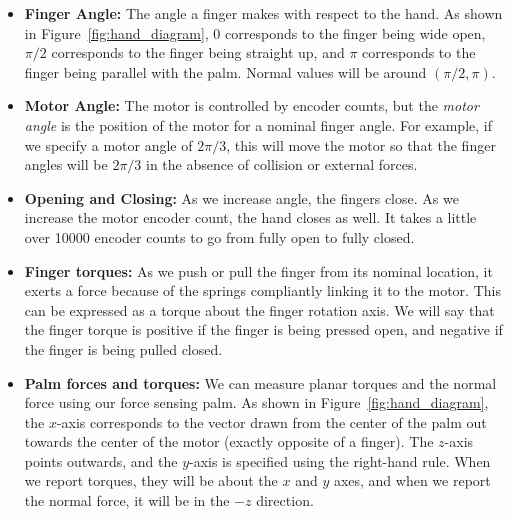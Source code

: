 \documentclass[letterpaper,notitlepage,10pt]{article}
\begin{document}
\begin{itemize}
\item \textbf{Finger Angle:} The angle a finger makes with respect to the hand. As shown in Figure~\ref{fig:hand_diagram}, 0 corresponds to the finger being wide open, $\pi/2$ corresponds to the finger being straight up, and $\pi$ corresponds to the finger being parallel with the palm. Normal values will be around $(\pi/2, \pi)$.
\item \textbf{Motor Angle:} The motor is controlled by encoder counts, but the \emph{motor angle} is the position of the motor for a nominal finger angle. For example, if we specify a motor angle of $2\pi/3$, this will move the motor so that the finger angles will be $2\pi/3$ in the absence of collision or external forces.
\item \textbf{Opening and Closing:} As we increase angle, the fingers close. As we increase the motor encoder count, the hand closes as well. It takes a little over 10000 encoder counts to go from fully open to fully closed.
\item \textbf{Finger torques:} As we push or pull the finger from its nominal location, it exerts a force because of the springs compliantly linking it to the motor. This can be expressed as a torque about the finger rotation axis. We will say that the finger torque is positive if the finger is being pressed open, and negative if the finger is being pulled closed.
\item \textbf{Palm forces and torques:} We can measure planar torques and the normal force using our force sensing palm. As shown in Figure~\ref{fig:hand_diagram}, the $x$-axis corresponds to the vector drawn from the center of the palm out towards the center of the motor (exactly opposite of a finger). The $z$-axis points outwards, and the $y$-axis is specified using the right-hand rule. When we report torques, they will be about the $x$ and $y$ axes, and when we report the normal force, it will be in the $-z$ direction.
\end{itemize}
\end{document}
